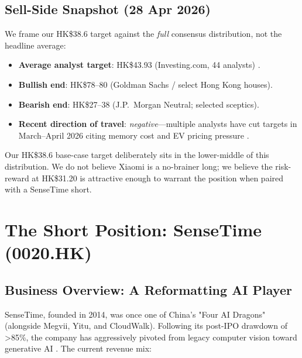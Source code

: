 \documentclass[11pt,a4paper]{article}
\begin{document}
\subsection*{Sell-Side Snapshot (28 Apr 2026)}
We frame our HK\$38.6 target against the \textit{full} consensus distribution, not the headline average:
\begin{itemize}
\item \textbf{Average analyst target}: HK\$43.93 (Investing.com, 44 analysts) \cite{simplywallst2026xiaomi}.
\item \textbf{Bullish end}: HK\$78--80 (Goldman Sachs / select Hong Kong houses).
\item \textbf{Bearish end}: HK\$27--38 (J.P.\ Morgan Neutral; selected sceptics).
\item \textbf{Recent direction of travel}: \textit{negative}---multiple analysts have cut targets in March--April 2026 citing memory cost and EV pricing pressure \cite{simplywallst2026xiaomi,daiwa2026xiaomi}.
\end{itemize}

Our HK\$38.6 base-case target deliberately sits in the lower-middle of this distribution. We do not believe Xiaomi is a no-brainer long; we believe the risk-reward at HK\$31.20 is attractive enough to warrant the position when paired with a SenseTime short.

\newpage
\section{The Short Position: SenseTime (0020.HK)}

\subsection{Business Overview: A Reformatting AI Player}

SenseTime, founded in 2014, was once one of China's "Four AI Dragons" (alongside Megvii, Yitu, and CloudWalk). Following its post-IPO drawdown of >85\%, the company has aggressively pivoted from legacy computer vision toward generative AI \cite{sensetime2025ar}. The current revenue mix:
\end{document}
